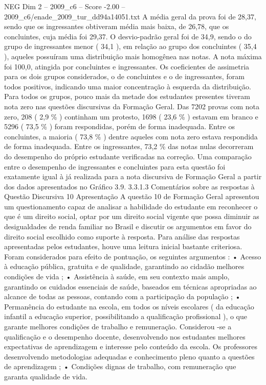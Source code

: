 \begin{textsample}{NEG Dim 2 – 2009\_c6 – Score -2.00 – 2009\_c6/enade\_2009\_tur\_dd94a14051.txt}
A média geral da prova foi de 28,37, sendo que os ingressantes obtiveram média mais baixa, de 26,78, que os concluintes, cuja média foi 29,37.
O desvio-padrão geral foi de 34,9, sendo o do grupo de ingressantes menor ( 34,1 ), em relação ao grupo dos concluintes ( 35,4 ), aqueles possuíram uma distribuição mais homogênea nas notas.
A nota máxima foi 100,0, atingida por concluintes e ingressantes.
Os coeficientes de assimetria para os dois grupos considerados, o de concluintes e o de ingressantes, foram todos positivos, indicando uma maior concentração à esquerda da distribuição.
Para todos os grupos, pouco mais da metade dos estudantes presentes tiveram nota zero nas questões discursivas da Formação Geral.
Das 7202 provas com nota zero, 208 ( 2,9 \% ) continham um protesto, 1698 ( 23,6 \% ) estavam em branco e 5296 ( 73,5 \% ) foram respondidas, porém de forma inadequada.
Entre os concluintes, a maioria ( 73,8 \% ) dentre aqueles com nota zero estava respondida de forma inadequada.
Entre os ingressantes, 73,2 \% das notas nulas decorreram do desempenho do próprio estudante verificadas na correção.
Uma comparação entre o desempenho de ingressantes e concluintes para esta questão foi exatamente igual à já realizada para a nota discursiva de Formação Geral a partir dos dados apresentados no Gráfico 3.9. 3.3.1.3 Comentários sobre as respostas à Questão Discursiva 10 Apresentação A questão 10 de Formação Geral apresentou um questionamento capaz de analisar a habilidade do estudante em reconhecer o que é um direito social, optar por um direito social vigente que possa diminuir as desigualdades de renda familiar no Brasil e discutir os argumentos em favor do direito social escolhido como suporte à resposta.
Para análise das respostas apresentadas pelos estudantes, houve uma leitura inicial bastante criteriosa.
Foram considerados para efeito de pontuação, os seguintes argumentos : • Acesso à educação pública, gratuita e de qualidade, garantindo ao cidadão melhores condições de vida ; • Assistência à saúde, em seu contexto mais amplo, garantindo os cuidados essenciais de saúde, baseados em técnicas apropriadas ao alcance de todas as pessoas, contando com a participação da população ; • Permanência do estudante na escola, em todos os níveis escolares ( da educação infantil a educação superior, possibilitando a qualificação profissional ), o que garante melhores condições de trabalho e remuneração.
Considerou -se a qualificação e o desempenho docente, desenvolvendo nos estudantes melhores expectativas de aprendizagem e interesse pelo conteúdo da escola.
Os professores desenvolvendo metodologias adequadas e conhecimento pleno quanto a questões de aprendizagem ; • Condições dignas de trabalho, com remuneração que garanta qualidade de vida.

\end{textsample}
